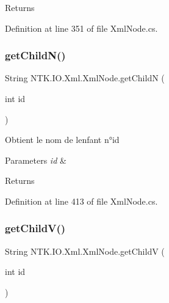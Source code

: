 \begin{DoxyReturn}{Returns}

\end{DoxyReturn}


Definition at line 351 of file Xml\+Node.\+cs.

\mbox{\label{class_n_t_k_1_1_i_o_1_1_xml_1_1_xml_node_abf82efdcc4a35355bf3506f04f8ea5b0}} 
\subsubsection{\texorpdfstring{getChildN()}{getChildN()}}
{\footnotesize\ttfamily String N\+T\+K.\+I\+O.\+Xml.\+Xml\+Node.\+get\+ChildN (\begin{DoxyParamCaption}\item[{int}]{id }\end{DoxyParamCaption})}



Obtient le nom de l\textquotesingle{}enfant n°id 


\begin{DoxyParams}{Parameters}
{\em id} & \\
\hline
\end{DoxyParams}
\begin{DoxyReturn}{Returns}

\end{DoxyReturn}


Definition at line 413 of file Xml\+Node.\+cs.

\mbox{\label{class_n_t_k_1_1_i_o_1_1_xml_1_1_xml_node_ac1467a6640f1f4239fd619c7f1c4aa50}} 
\subsubsection{\texorpdfstring{getChildV()}{getChildV()}\hspace{0.1cm}{\footnotesize\ttfamily [1/2]}}
{\footnotesize\ttfamily String N\+T\+K.\+I\+O.\+Xml.\+Xml\+Node.\+get\+ChildV (\begin{DoxyParamCaption}\item[{int}]{id }\end{DoxyParamCaption})}



